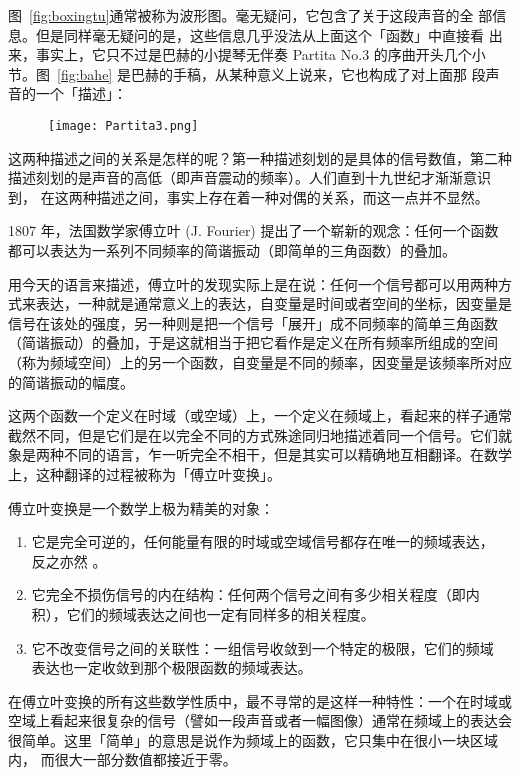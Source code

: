 图~\ref{fig:boxingtu}通常被称为波形图。毫无疑问，它包含了关于这段声音的全
部信息。但是同样毫无疑问的是，这些信息几乎没法从上面这个「函数」中直接看
出来，事实上，它只不过是巴赫的小提琴无伴奏 Partita No.3 的序曲开头几个小
节。图~\ref{fig:bahe} 是巴赫的手稿，从某种意义上说来，它也构成了对上面那
段声音的一个「描述」：

\begin{figure}[htbp]
  \centering
  \texttt{[image: Partita3.png]}
\end{figure}

这两种描述之间的关系是怎样的呢？第一种描述刻划的是具体的信号数值，第二种
描述刻划的是声音的高低（即声音震动的频率）。人们直到十九世纪才渐渐意识到，
在这两种描述之间，事实上存在着一种对偶的关系，而这一点并不显然。

1807 年，法国数学家傅立叶 (J. Fourier) 提出了一个崭新的观念：任何一个函数
都可以表达为一系列不同频率的简谐振动（即简单的三角函数）的叠加。

用今天的语言来描述，傅立叶的发现实际上是在说：任何一个信号都可以用两种方
式来表达，一种就是通常意义上的表达，自变量是时间或者空间的坐标，因变量是
信号在该处的强度，另一种则是把一个信号「展开」成不同频率的简单三角函数
（简谐振动）的叠加，于是这就相当于把它看作是定义在所有频率所组成的空间
（称为频域空间）上的另一个函数，自变量是不同的频率，因变量是该频率所对应
的简谐振动的幅度。


这两个函数一个定义在时域（或空域）上，一个定义在频域上，看起来的样子通常
截然不同，但是它们是在以完全不同的方式殊途同归地描述着同一个信号。它们就
象是两种不同的语言，乍一听完全不相干，但是其实可以精确地互相翻译。在数学
上，这种翻译的过程被称为「傅立叶变换」。

傅立叶变换是一个数学上极为精美的对象：
\begin{enumerate}
\item 它是完全可逆的，任何能量有限的时域或空域信号都存在唯一的频域表达，
  反之亦然 。
\item 它完全不损伤信号的内在结构：任何两个信号之间有多少相关程度（即内
  积），它们的频域表达之间也一定有同样多的相关程度。
\item 它不改变信号之间的关联性：一组信号收敛到一个特定的极限，它们的频域
  表达也一定收敛到那个极限函数的频域表达。
\end{enumerate}

在傅立叶变换的所有这些数学性质中，最不寻常的是这样一种特性：一个在时域或
空域上看起来很复杂的信号（譬如一段声音或者一幅图像）通常在频域上的表达会
很简单。这里「简单」的意思是说作为频域上的函数，它只集中在很小一块区域内，
而很大一部分数值都接近于零。

